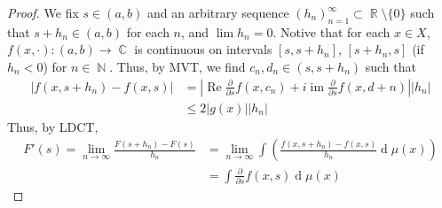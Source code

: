 \documentclass[12pt, a4paper]{memoir}
\DeclareMathOperator{\N}{{\mathbb{N}}}
\DeclareMathOperator{\R}{{\mathbb{R}}}
\DeclareMathOperator{\C}{{\mathbb{C}}}
\theoremstyle{nonumberplain}
\newtheorem{proof}{Proof}
\DeclareMathOperator{\im}{im}
\renewcommand{\Re}{\ensuremath{\operatorname{Re}}}
\renewcommand{\d}[1]{\ensuremath{\operatorname{d}\!{#1}}} %
\begin{document}
\begin{proof}
    We fix $s\in(a,b)$ and an arbitrary sequence $(h_n)_{n=1}^\infty\subset\R\setminus\{0\}$ such that $s+h_n\in(a,b)$ for each $n$, and $\lim h_n=0$.
    Notive that for each $x\in X$, $f(x,\cdot):(a,b)\to\C$ is continuous on intervals $[s,s+h_n]$, $[s+h_n,s]$ (if $h_n<0$) for $n\in\N$.
    Thus, by MVT, we find $c_n,d_n\in(s,s+h_n)$ such that
    \begin{align*}
        |f(x,s+h_n)-f(x,s)| &= \left\lvert\Re\frac{\partial}{\partial s}f(x,c_n)+i\im\frac{\partial}{\partial s}f(x,d+n)\right\rvert|h_n|\\
                            &\leq 2|g(x)||h_n|
    \end{align*}
    Thus, by LDCT,
    \begin{align*}
        F'(s)=\lim_{n\to\infty}\frac{F(s+h_n)-F(s)}{h_n}&=\lim_{n\to\infty}\int\left(\frac{f(x,s+h_n)-f(x,s)}{h_n}\d{\mu(x)}\right)\\
                                                        &= \int\frac{\partial}{\partial s}f(x,s)\d{\mu(x)}
    \end{align*}
\end{proof}
\end{document}
